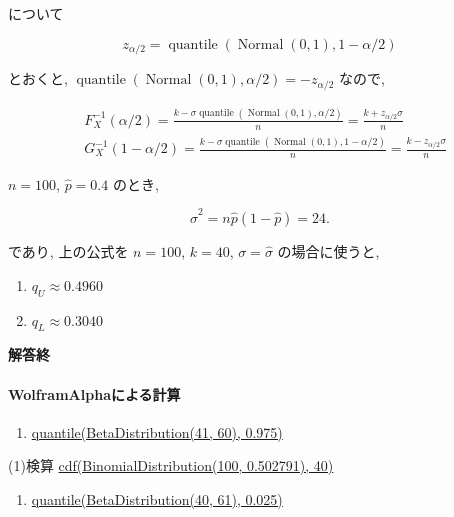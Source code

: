 \documentclass[
  letterpaper,
  DIV=11,
  numbers=noendperiod]{scrartcl}
\let\oldparagraph\paragraph
\renewcommand{\paragraph}[1]{\oldparagraph{#1}\mbox{}}
\providecommand{\tightlist}{%
  \setlength{\itemsep}{0pt}\setlength{\parskip}{0pt}}\usepackage{longtable,booktabs,array}
\begin{document}
について

\[
z_{\alpha/2} = \operatorname{quantile}(\operatorname{Normal}(0,1), 1 - \alpha/2)
\]

とおくと,
\(\operatorname{quantile}(\operatorname{Normal}(0,1), \alpha/2) = -z_{\alpha/2}\)
なので,

\[
\begin{aligned}
&
F_X^{-1}(\alpha/2) =
\frac{k - \sigma\operatorname{quantile}(\operatorname{Normal}(0,1), \alpha/2)}{n} =
\frac{k + z_{\alpha/2}\sigma}{n}
\\ &
G_X^{-1}(1-\alpha/2) =
\frac{k - \sigma\operatorname{quantile}(\operatorname{Normal}(0,1), 1-\alpha/2)}{n} =
\frac{k - z_{\alpha/2}\sigma}{n}
\end{aligned}
\]

\(n=100\), \(\hat{p}=0.4\) のとき,

\[
\hat{\sigma}^2 = n\hat{p}(1-\hat{p}) = 24.
\]

であり, 上の公式を \(n=100\), \(k=40\), \(\sigma=\hat\sigma\)
の場合に使うと,

\begin{enumerate}
\def\labelenumi{(\arabic{enumi})}
\setcounter{enumi}{2}
\item
  \(q_U \approx 0.4960\)
\item
  \(q_L \approx 0.3040\)
\end{enumerate}

\textbf{解答終}

\hypertarget{wolframalphaux306bux3088ux308bux8a08ux7b97}{%
\paragraph{WolframAlphaによる計算}\label{wolframalphaux306bux3088ux308bux8a08ux7b97}}

\begin{enumerate}
\def\labelenumi{(\arabic{enumi})}
\tightlist
\item
  \href{https://www.wolframalpha.com/input?i=quantile\%28BetaDistribution\%2841\%2C+60\%29\%2C+0.975\%29}{quantile(BetaDistribution(41,
  60), 0.975)}
\end{enumerate}

(1)検算
\href{https://www.wolframalpha.com/input?i=cdf\%28BinomialDistribution\%28100\%2C+0.502791\%29\%2C+40\%29}{cdf(BinomialDistribution(100,
0.502791), 40)}

\begin{enumerate}
\def\labelenumi{(\arabic{enumi})}
\setcounter{enumi}{1}
\tightlist
\item
  \href{https://www.wolframalpha.com/input?i=quantile\%28BetaDistribution\%2840\%2C+61\%29\%2C+0.025\%29}{quantile(BetaDistribution(40,
  61), 0.025)}
\end{enumerate}
\end{document}

